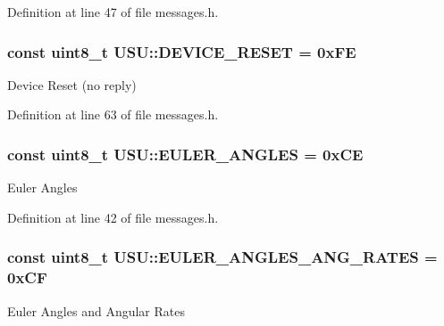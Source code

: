 \-Definition at line 47 of file messages.\-h.

\hypertarget{namespace_u_s_u_a7c9f78c9bb18ba92a529bf5819f6a5d2}{
\subsubsection[{\-D\-E\-V\-I\-C\-E\-\_\-\-R\-E\-S\-E\-T}]{\setlength{\rightskip}{0pt plus 5cm}const uint8\-\_\-t {\bf \-U\-S\-U\-::\-D\-E\-V\-I\-C\-E\-\_\-\-R\-E\-S\-E\-T} = 0x\-F\-E}}\label{namespace_u_s_u_a7c9f78c9bb18ba92a529bf5819f6a5d2}
\-Device \-Reset (no reply) 

\-Definition at line 63 of file messages.\-h.

\hypertarget{namespace_u_s_u_a6d35ce7963dec25cc43e551dccd71453}{
\subsubsection[{\-E\-U\-L\-E\-R\-\_\-\-A\-N\-G\-L\-E\-S}]{\setlength{\rightskip}{0pt plus 5cm}const uint8\-\_\-t {\bf \-U\-S\-U\-::\-E\-U\-L\-E\-R\-\_\-\-A\-N\-G\-L\-E\-S} = 0x\-C\-E}}\label{namespace_u_s_u_a6d35ce7963dec25cc43e551dccd71453}
\-Euler \-Angles 

\-Definition at line 42 of file messages.\-h.

\hypertarget{namespace_u_s_u_af604e3d925c2fe95f8a6b1af3f79d2d0}{
\subsubsection[{\-E\-U\-L\-E\-R\-\_\-\-A\-N\-G\-L\-E\-S\-\_\-\-A\-N\-G\-\_\-\-R\-A\-T\-E\-S}]{\setlength{\rightskip}{0pt plus 5cm}const uint8\-\_\-t {\bf \-U\-S\-U\-::\-E\-U\-L\-E\-R\-\_\-\-A\-N\-G\-L\-E\-S\-\_\-\-A\-N\-G\-\_\-\-R\-A\-T\-E\-S} = 0x\-C\-F}}\label{namespace_u_s_u_af604e3d925c2fe95f8a6b1af3f79d2d0}
\-Euler \-Angles and \-Angular \-Rates 

